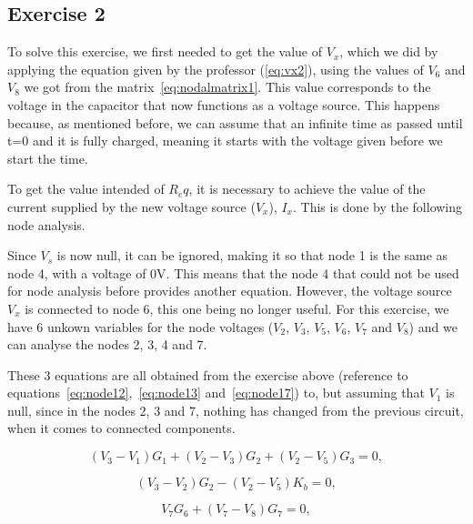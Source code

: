 \subsection{Exercise 2}
\label{sec:exercise2}

To solve this exercise, we first needed to get the value of $V_x$, which we did by applying the equation given by the professor (\ref{eq:vx2}), using the values of $V_6$ and $V_8$ we got from the matrix~\ref{eq:nodalmatrix1}. This value corresponds to the voltage in the capacitor that now functions as a voltage source. This happens because, as mentioned before, we can assume that an infinite time as passed until t=0 and it is fully charged, meaning it starts with the voltage given before we start the time.

To get the value intended of $R_eq$, it is necessary to achieve the value of the current supplied by the new voltage source ($V_x$), $I_x$. This is done by the following node analysis.

Since $V_s$ is now null, it can be ignored, making it so that node 1 is the same as node 4, with a voltage of 0V. This means that the node 4 that could not be used for node analysis before provides another equation. However, the voltage source $V_x$ is connected to node 6, this one being no longer useful. For this exercise, we have 6 unkown variables for the node voltages ($V_2$, $V_3$, $V_5$, $V_6$, $V_7$ and $V_8$) and we can analyse the nodes 2, 3, 4 and 7.

These 3 equations are all obtained from the exercise above (reference to equations~\ref{eq:node12},~\ref{eq:node13} and~\ref{eq:node17}) to, but assuming that $V_1$ is null, since in the nodes 2, 3 and 7, nothing has changed from the previous circuit, when it comes to connected components.

\begin{equation}
  (V_{3} - V_{1})G_{1} + (V_{2} - V_{3})G_{2} + (V_{2} - V_{5})G_{3}= 0,
  \label{eq:node22}
\end{equation}

\begin{equation}
  (V_{3} - V_{2})G_{2} - (V_{2} - V_{5})K_{b} = 0,
  \label{eq:node23}
\end{equation}

\begin{equation}
  V_{7}G_{6} + (V_{7} - V_{8})G_{7} = 0,
  \label{eq:node27}
\end{equation}

